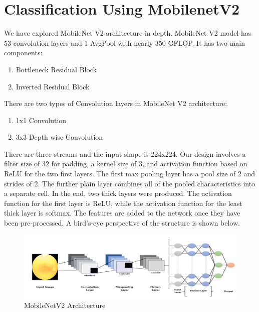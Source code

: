 \section{Classification Using MobilenetV2}
We have explored MobileNet V2 architecture in depth. MobileNet V2 model has 53 convolution layers and 1 AvgPool with nearly 350 GFLOP. It has two main components:
\begin{enumerate}
    \item Bottleneck Residual Block
    \item Inverted Residual Block
\end{enumerate}
There are two types of Convolution layers in MobileNet V2 architecture:
\begin{enumerate}
    \item 1x1 Convolution
    \item 3x3 Depth wise Convolution 
\end{enumerate}
There are three streams and the input shape is 224x224. Our design involves a filter size of 32 for padding, a kernel size of 3, and activation function based on ReLU for the two first layers. The first max pooling layer has a pool size of 2 and strides of 2. The further plain layer combines all of the pooled characteristics into a separate cell. In the end, two thick layers were produced. The activation function for the first layer is ReLU, while the activation function for the least thick layer is softmax. The features are added to the network once they have been pre-processed. A bird's-eye perspective of the structure is shown below.
\begin{figure}[H]
    \centering
    \includegraphics[scale=0.5]{40_Chapter_4/Mb2.png}
    \caption{MobileNetV2 Architecture}
    \label{MobileNetV2 Architecture}
\end{figure}
\vspace{5pt}
